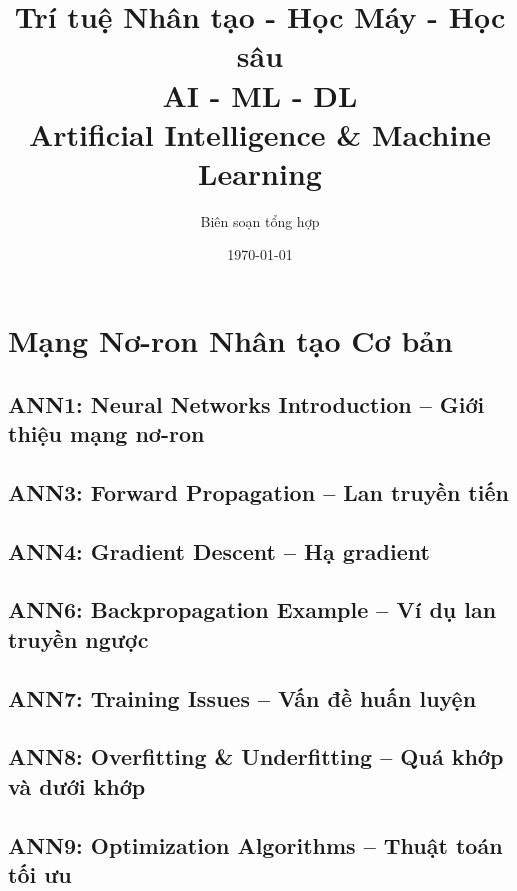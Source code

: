 \documentclass[12pt,a4paper]{report}
\title{
    \textbf{Trí tuệ Nhân tạo - Học Máy - Học sâu}\\
    \textbf{AI - ML - DL}\\
    \large Artificial Intelligence \& Machine Learning
}
\author{Biên soạn tổng hợp}
\date{\today}
\begin{document}
\maketitle
\tableofcontents
\newpage

\part{Mạng Nơ-ron Nhân tạo Cơ bản}

\chapter{ANN1: Neural Networks Introduction -- Giới thiệu mạng nơ-ron}


\chapter{ANN3: Forward Propagation -- Lan truyền tiến}


\chapter{ANN4: Gradient Descent -- Hạ gradient}


\chapter{ANN6: Backpropagation Example -- Ví dụ lan truyền ngược}


\chapter{ANN7: Training Issues -- Vấn đề huấn luyện}


\chapter{ANN8: Overfitting \& Underfitting -- Quá khớp và dưới khớp}


\chapter{ANN9: Optimization Algorithms -- Thuật toán tối ưu}

\end{document}
